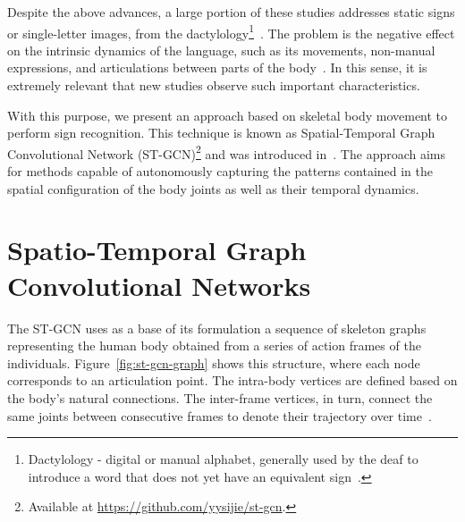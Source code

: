 Despite the above advances, a large portion of these studies addresses static signs or single-letter images, from the dactylology\footnote{Dactylology - digital or manual alphabet, generally used by the deaf to introduce a word that does not yet have an equivalent sign~\cite{pereira-choi-2011}.
}~\cite{taskiran-2018,das-2018}. The problem is the negative effect on the intrinsic dynamics of the language, such as its movements, non-manual expressions, and articulations between parts of the body~\cite{quadros-2004}. In this sense, it is extremely relevant that new studies observe such important characteristics.

With this purpose, we present an approach based on skeletal body movement to perform sign recognition. This technique is known as Spatial-Temporal Graph Convolutional Network (ST-GCN)\footnote {Available at \url{https://github.com/yysijie/st-gcn}.} and was introduced in~\cite{st-gcn-2018}. The approach aims for methods capable of autonomously capturing the patterns contained in the spatial configuration of the body joints as well as their temporal dynamics.


\section{Spatio-Temporal Graph Convolutional Networks}
\label{sec:st-gcn}

The ST-GCN uses as a base of its formulation a sequence of skeleton graphs representing the human body obtained from a series of action frames of the individuals. Figure~\ref{fig:st-gcn-graph} shows this structure, where each node corresponds to an articulation point. The intra-body vertices are defined based on the body's natural connections. The inter-frame vertices, in turn, connect the same joints between consecutive frames to denote their trajectory over time~\cite{st-gcn-2018}. 

